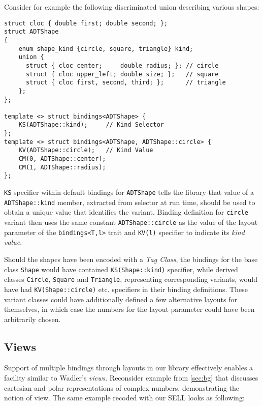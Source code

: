 \documentclass[preprint]{sigplanconf}
\makeatletter
\DeclareRobustCommand{\code}[1]{{\lstinline[breaklines=false,escapechar=@]{#1}}}
\makeatother
\begin{document}
Consider for example the following discriminated union describing various 
shapes:

\begin{lstlisting}[keepspaces,columns=flexible]
struct cloc { double first; double second; };
struct ADTShape
{
    enum shape_kind {circle, square, triangle} kind;
    union {
      struct { cloc center;     double radius; }; // circle
      struct { cloc upper_left; double size; };   // square
      struct { cloc first, second, third; };      // triangle
    };
};

template <> struct bindings<ADTShape> { 
    KS(ADTShape::kind);     // Kind Selector
};
template <> struct bindings<ADTShape, ADTShape::circle> {
    KV(ADTShape::circle);   // Kind Value
    CM(0, ADTShape::center);
    CM(1, ADTShape::radius);
};
\end{lstlisting}

\noindent
\code{KS} specifier within default bindings for \code{ADTShape} tells the library 
that value of a \code{ADTShape::kind} member, extracted from selector at run time, 
should be used to obtain a unique value that identifies the variant. Binding 
definition for \code{circle} variant then uses the same constant 
\code{ADTShape::circle} as the value of the layout parameter of the 
\code{bindings<T,l>} trait and \code{KV(l)} specifier to indicate its \emph{kind 
value}.

Should the shapes have been encoded with a \emph{Tag Class}, the bindings for 
the base class \code{Shape} would have contained \code{KS(Shape::kind)} 
specifier, while derived classes \code{Circle}, \code{Square} and 
\code{Triangle}, representing corresponding variants, would have had 
\code{KV(Shape::circle)} etc. specifiers in their binding definitions. These 
variant classes could have additionally defined a few alternative layouts for 
themselves, in which case the numbers for the layout parameter could have been 
arbitrarily chosen.

\subsection{Views}
\label{sec:view}

Support of multiple bindings through layouts in our library effectively enables 
a facility similar to Wadler's \emph{views}. Reconsider example from 
\textsection\ref{sec:bg} that discusses cartesian and polar representations of 
complex numbers, demonstrating the notion of view. The same example recoded with 
our SELL looks as following:
\end{document}
